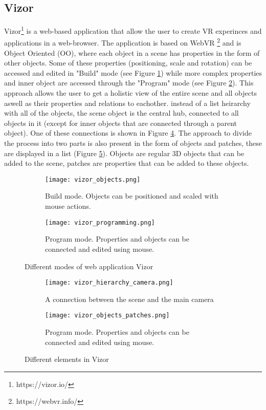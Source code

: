 \subsection{Vizor}
Vizor\footnote{https://vizor.io/} is a web-based application that allow the user to create VR experinces and applications in a web-browser. The application is based on WebVR \footnote{https://webvr.info/} and is Object Oriented (OO), where each object in a scene has properties in the form of other objects. Some of these properties (positioning, scale and rotation) can be accessed and edited in "Build" mode (see Figure \ref{fig:vizor:buildmode}) while more complex properties and inner object are accessed through the "Program" mode (see Figure \ref{fig:vizor:programmode}). This approach allows the user to get a holistic view of the entire scene and all objects aswell as their properties and relations to eachother. instead of a list heirarchy with all of the objects, the scene object is the central hub, connected to all objects in it (except for inner objects that are connected through a parent object). One of these connections is shown in Figure \ref{fig:vizor:hierarchycamera}. The approach to divide the process into two parts is also present in the form of objects and patches, these are displayed in a list (Figure \ref{fig:vizor:objectspatches}). Objects are regular 3D objects that can be added to the scene, patches are properties that can be added to these objects.

\begin{figure}
\begin{subfigure}{.5\textwidth}
  \centering
  \texttt{[image: vizor\_objects.png]}
  \caption{Build mode. Objects can be positioned and scaled with mouse actions.}
  \label{fig:vizor:buildmode}
\end{subfigure}%
\begin{subfigure}{.5\textwidth}
  \centering
  \texttt{[image: vizor\_programming.png]}
  \caption{Program mode. Properties and objects can be connected and edited using mouse. }
  \label{fig:vizor:programmode}
\end{subfigure}
\caption{Different modes of web application Vizor}
\label{fig:vizor}
\end{figure}

\begin{figure}
\begin{subfigure}{.5\textwidth}
  \centering
  \texttt{[image: vizor\_hierarchy\_camera.png]}
  \caption{A connection between the scene and the main camera}
  \label{fig:vizor:hierarchycamera}
\end{subfigure}%
\begin{subfigure}{.5\textwidth}
  \centering
  \texttt{[image: vizor\_objects\_patches.png]}
  \caption{Program mode. Properties and objects can be connected and edited using mouse. }
  \label{fig:vizor:objectspatches}
\end{subfigure}
\caption{Different elements in Vizor}
\label{fig:vizorelements}
\end{figure}

